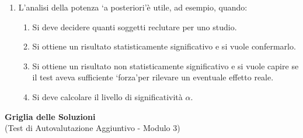 \documentclass[12pt, a4paper]{article}
\newcommand{\alphaerr}{\alpha} %
\begin{document}
\begin{enumerate}
     \item L'analisi della potenza   `a posteriori'è utile, ad esempio, quando:
    \begin{enumerate}
        \item Si deve decidere quanti soggetti reclutare per uno studio.
        \item Si ottiene un risultato statisticamente significativo e si vuole confermarlo.
        \item Si ottiene un risultato non statisticamente significativo e si vuole capire se il test aveva sufficiente   `forza'per rilevare un eventuale effetto reale.
        \item Si deve calcolare il livello di significatività $\alphaerr$.
    \end{enumerate}


\end{enumerate} %

\newpage %

\begin{center}
    \Large\textbf{Griglia delle Soluzioni} \\
    \vspace{0.5cm}
    \normalsize{(Test di Autovalutazione Aggiuntivo - Modulo 3)}
\end{center}
\vspace{1cm}
\end{document}
